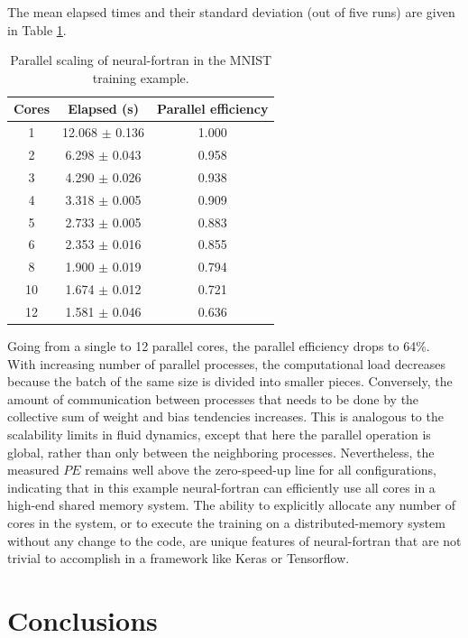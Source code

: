 \documentclass[sigplan, review=false, screen=true, balance=true]{acmart}
\begin{document}
The mean elapsed times and their standard deviation (out of five runs) are
given in Table \ref{table_parallel}.

\begin{center}
\begin{table}[h]
\caption{Parallel scaling of neural-fortran in the MNIST training example.}
\label{table_parallel}
\begin{tabular}{c|c|c}
  \hline
  Cores & Elapsed (s) & Parallel efficiency \\
  \hline
  1 & 12.068 $\pm$ 0.136 & 1.000 \\
  2 & 6.298 $\pm$ 0.043 & 0.958 \\
  3 & 4.290 $\pm$ 0.026 & 0.938 \\
  4 & 3.318 $\pm$ 0.005 & 0.909 \\
  5 & 2.733 $\pm$ 0.005 & 0.883 \\
  6 & 2.353 $\pm$ 0.016 & 0.855 \\
  8 & 1.900 $\pm$ 0.019 & 0.794 \\
  10 & 1.674 $\pm$ 0.012 & 0.721 \\
  12 & 1.581 $\pm$ 0.046 & 0.636 \\
  \hline
\end{tabular}
\end{table}
\end{center}

Going from a single to 12 parallel cores, the parallel efficiency drops
to 64\%. With increasing number of parallel processes, the computational
load decreases because the batch of the same size is divided into smaller pieces.
Conversely, the amount of communication between processes that needs to be
done by the collective sum of weight and bias tendencies increases. This is
analogous to the scalability limits in fluid dynamics, except that here the
parallel operation is global, rather than only between the neighboring
processes. 
Nevertheless, the measured $PE$ remains well above the zero-speed-up line
for all configurations, indicating that in this example neural-fortran
can efficiently use all cores in a high-end shared memory system.
The ability to explicitly allocate any number
of cores in the system, or to execute the training on a distributed-memory
system without any change to the code, are unique features of neural-fortran
that are not trivial to accomplish in a framework like Keras or Tensorflow.

\section{Conclusions} \label{section_conclusions}
\end{document}
